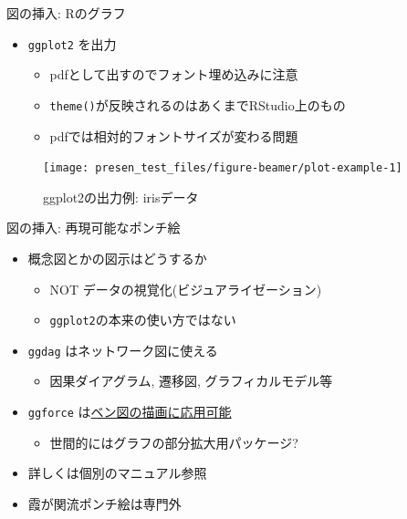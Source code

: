 \documentclass[14pt,ignorenonframetext,]{beamer}
\providecommand{\tightlist}{%
  \setlength{\itemsep}{0pt}\setlength{\parskip}{0pt}}
\begin{document}
\begin{frame}[fragile]{図の挿入: Rのグラフ}
\protect\hypertarget{ux56f3ux306eux633fux5165-rux306eux30b0ux30e9ux30d5}{}

\begin{itemize}
\tightlist
\item
  \texttt{ggplot2} を出力

  \begin{itemize}
  \tightlist
  \item
    pdfとして出すのでフォント埋め込みに注意
  \item
    \texttt{theme()}が反映されるのはあくまでRStudio上のもの
  \item
    pdfでは相対的フォントサイズが変わる問題
  \end{itemize}
\end{itemize}

\begin{figure}

{\centering \texttt{[image: presen\_test\_files/figure-beamer/plot-example-1]} 

}

\caption{ggplot2の出力例: irisデータ}\label{fig:plot-example}
\end{figure}

\end{frame}

\begin{frame}[fragile]{図の挿入: 再現可能なポンチ絵}
\protect\hypertarget{ux56f3ux306eux633fux5165-ux518dux73feux53efux80fdux306aux30ddux30f3ux30c1ux7d75}{}

\begin{itemize}
\tightlist
\item
  概念図とかの図示はどうするか

  \begin{itemize}
  \tightlist
  \item
    NOT データの視覚化(ビジュアライゼーション)
  \item
    \texttt{ggplot2}の本来の使い方ではない
  \end{itemize}
\item
  \texttt{ggdag} はネットワーク図に使える

  \begin{itemize}
  \tightlist
  \item
    因果ダイアグラム, 遷移図, グラフィカルモデル等
  \end{itemize}
\item
  \texttt{ggforce}
  は\href{https://rpubs.com/sdutky/559050}{ベン図の描画に応用可能}

  \begin{itemize}
  \tightlist
  \item
    世間的にはグラフの部分拡大用パッケージ?
  \end{itemize}
\item
  詳しくは個別のマニュアル参照
\item
  霞が関流ポンチ絵は専門外
\end{itemize}

\end{frame}
\end{document}
